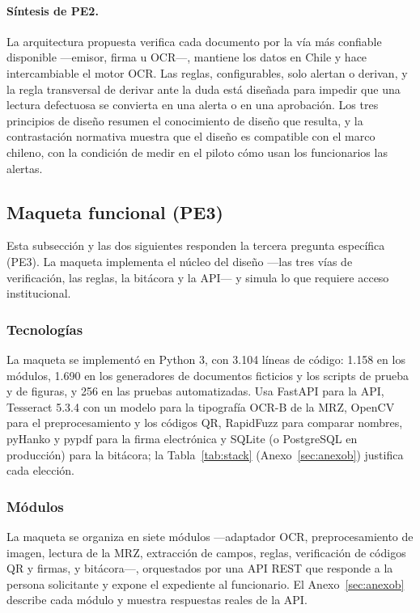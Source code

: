 \documentclass[11pt,a4paper]{article}
\begin{document}
\paragraph{Síntesis de PE2.} La arquitectura propuesta verifica cada documento por la vía más confiable disponible ---emisor, firma u OCR---, mantiene los datos en Chile y hace intercambiable el motor OCR. Las reglas, configurables, solo alertan o derivan, y la regla transversal de derivar ante la duda está diseñada para impedir que una lectura defectuosa se convierta en una alerta o en una aprobación. Los tres principios de diseño resumen el conocimiento de diseño que resulta, y la contrastación normativa muestra que el diseño es compatible con el marco chileno, con la condición de medir en el piloto cómo usan los funcionarios las alertas.

\subsection{Maqueta funcional (PE3)}
\label{sec:implementacion}
Esta subsección y las dos siguientes responden la tercera pregunta específica (PE3). La maqueta implementa el núcleo del diseño ---las tres vías de verificación, las reglas, la bitácora y la API--- y simula lo que requiere acceso institucional.

\subsubsection{Tecnologías}
La maqueta se implementó en Python 3, con 3.104 líneas de código: 1.158 en los módulos, 1.690 en los generadores de documentos ficticios y los scripts de prueba y de figuras, y 256 en las pruebas automatizadas. Usa FastAPI para la API, Tesseract 5.3.4 con un modelo para la tipografía OCR-B de la MRZ, OpenCV para el preprocesamiento y los códigos QR, RapidFuzz para comparar nombres, pyHanko y pypdf para la firma electrónica y SQLite (o PostgreSQL en producción) para la bitácora; la Tabla~\ref{tab:stack} (Anexo~\ref{sec:anexob}) justifica cada elección.

\subsubsection{Módulos}
La maqueta se organiza en siete módulos ---adaptador OCR, preprocesamiento de imagen, lectura de la MRZ, extracción de campos, reglas, verificación de códigos QR y firmas, y bitácora---, orquestados por una API REST que responde a la persona solicitante y expone el expediente al funcionario. El Anexo~\ref{sec:anexob} describe cada módulo y muestra respuestas reales de la API.
\end{document}
